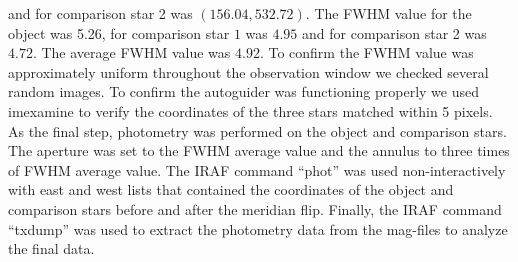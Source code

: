and for comparison star 2 was $(156.04, 532.72)$. The FWHM value for the object was 5.26, for 
comparison star $1$ was $4.95$ and for comparison star 2 was $4.72$. The average FWHM value was $4.92$. 
To confirm the FWHM value was approximately uniform throughout the observation window we 
checked several random images. To confirm the autoguider was functioning properly we used 
imexamine to verify the coordinates of the three stars matched within 5 pixels. \\
\noindent As the final step, photometry was performed on the object and comparison stars. 
The aperture was set to the FWHM average value and the annulus to three times of 
FWHM average value. The IRAF command “phot” was used non-interactively with east 
and west lists that contained the coordinates of the object and comparison stars 
before and after the meridian flip. Finally, the IRAF command “txdump” was used to 
extract the photometry data from the mag-files to analyze the final data. 
